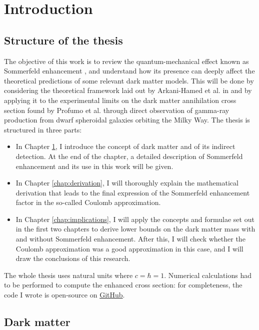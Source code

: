 \chapter{Introduction}\label{chap:introduction}

\section{Structure of the thesis}
The objective of this work is to review the quantum-mechanical effect known as Sommerfeld enhancement \cite{Sommerfeld_1931}, and understand how its presence can deeply affect the theoretical predictions of some relevant dark matter models. This will be done by considering the theoretical framework laid out by Arkani-Hamed et al. in \cite{Arkani_2009} and by applying it to the experimental limits on the dark matter annihilation cross section found by Profumo et al. \cite{Profumo_2018} through direct observation of gamma-ray production from dwarf spheroidal galaxies orbiting the Milky Way. The thesis is structured in three parts:
\begin{itemize}
	\item In Chapter \ref{chap:introduction}, I introduce the concept of dark matter and of its indirect detection. At the end of the chapter, a detailed description of Sommerfeld enhancement and its use in this work will be given.
	\item In Chapter \ref{chap:derivation}, I will thoroughly explain the mathematical derivation that leads to the final expression of the Sommerfeld enhancement factor in the so-called Coulomb approximation.
	\item In Chapter \ref{chap:implications}, I will apply the concepts and formulae set out in the first two chapters to derive lower bounds on the dark matter mass with and without Sommerfeld enhancement. After this, I will check whether the Coulomb approximation was a good approximation in this case, and I will draw the conclusions of this research.
\end{itemize}

The whole thesis uses natural units where \(c=\hbar=1\). Numerical calculations had to be performed to compute the enhanced cross section: for completeness, the code I wrote is open-source on \href{https://github.com/LuckeeDev/bachelor-thesis}{GitHub}.

\section{Dark matter}

